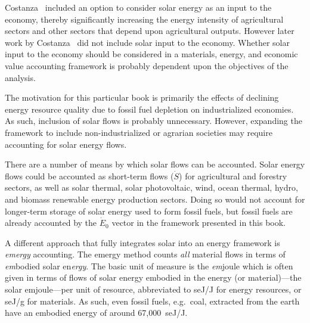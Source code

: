 Costanza~\cite{Costanza:1978vd} included an option to consider 
solar energy as an input to the economy, 
thereby significantly increasing the energy intensity 
of agricultural sectors and other sectors 
that depend upon agricultural outputs. 
However later work by Costanza~\cite{Costanza:1984tq,Costanza:1980ww} 
did not include solar input to the economy.
Whether solar input to the economy 
should be considered in a materials, energy, and economic value 
accounting framework is probably dependent upon 
the objectives of the analysis. 

The motivation for this particular book is primarily 
the effects of declining energy resource quality
due to fossil fuel depletion on industrialized economies. 
As such, inclusion of solar flows is probably unnecessary. 
However, expanding the framework to include non-industrialized 
or agrarian societies may require accounting for solar energy flows. 

There are a number of means by which solar flows can be accounted. 
Solar energy flows could be accounted as short-term flows ($\dot{S}$)
for agricultural and forestry sectors, 
as well as 
solar thermal, 
solar photovoltaic, 
wind, 
ocean thermal, 
hydro, and
biomass
renewable energy
production sectors.
Doing so would not account for longer-term storage
of solar energy used to form fossil fuels, 
but fossil fuels are already accounted by the $\dot{E}_{0}$ vector
in the framework presented in this book.

A different approach that fully integrates solar 
into an energy framework is \emph{emergy} accounting.
The emergy method counts \emph{all} material flows 
in terms of \emph{em}bodied solar en\emph{ergy}.\cite{Odum1975, Odum1996}
The basic unit of measure is 
the \emph{em}joule which is often given in terms 
of flows of solar energy embodied in 
the energy (or material)---the solar emjoule---per unit of resource, 
abbreviated to seJ/J for energy resources, 
or seJ/g for materials. 
As such, even fossil fuels, e.g.\ coal, 
extracted from the earth have an embodied energy 
of around 67,000~seJ/J.\cite{Brown2004} 


